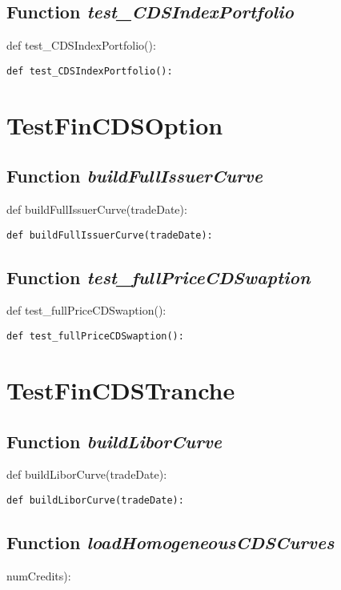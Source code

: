 \documentclass[twoside,11pt]{book}
\begin{document}
\subsection{Function {\it test\_CDSIndexPortfolio}}
def test\_CDSIndexPortfolio():

\begin{lstlisting}
def test_CDSIndexPortfolio():
\end{lstlisting}


\newpage
\section{TestFinCDSOption}

\subsection{Function {\it buildFullIssuerCurve}}
def buildFullIssuerCurve(tradeDate):

\begin{lstlisting}
def buildFullIssuerCurve(tradeDate):
\end{lstlisting}

\subsection{Function {\it test\_fullPriceCDSwaption}}
def test\_fullPriceCDSwaption():

\begin{lstlisting}
def test_fullPriceCDSwaption():
\end{lstlisting}


\newpage
\section{TestFinCDSTranche}

\subsection{Function {\it buildLiborCurve}}
def buildLiborCurve(tradeDate):

\begin{lstlisting}
def buildLiborCurve(tradeDate):
\end{lstlisting}

\subsection{Function {\it loadHomogeneousCDSCurves}}
numCredits):
\end{document}
